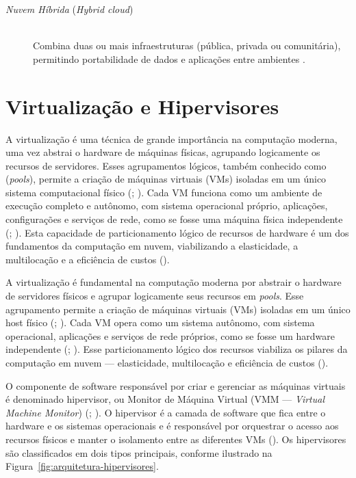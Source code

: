 \begin{itemize}
\begin{description}
  \item[\emph{Nuvem Híbrida} (\textit{Hybrid cloud})] \hfill \\ Combina duas ou mais infraestruturas (pública, privada ou comunitária), permitindo portabilidade de dados e aplicações entre ambientes \cite{mell2011}.
\end{description}
 

\section{Virtualização e Hipervisores}
A virtualização é uma técnica de grande importância na computação moderna, uma vez  abstrai o hardware de máquinas físicas, agrupando logicamente os recursos de servidores. Esses agrupamentos lógicos, também conhecido como (\textit{pools}), permite a criação de máquinas virtuais (VMs) isoladas em um único sistema computacional físico (\cite{carissimi2008}; \cite{kominos2017}). Cada VM funciona como um ambiente de execução completo e autônomo, com sistema operacional próprio, aplicações, configurações e  serviços de rede, como se fosse uma máquina física independente (\cite{carissimi2008}; \cite{smith2005}). Esta capacidade de particionamento lógico de recursos de hardware é um dos fundamentos da computação em nuvem, viabilizando a elasticidade, a multilocação e a eficiência de custos (\cite{chawla2025}).

A virtualização é fundamental na computação moderna por abstrair o hardware de servidores físicos e agrupar logicamente seus recursos em \textit{pools}. Esse agrupamento permite a criação de máquinas virtuais (VMs) isoladas em um único host físico (\cite{carissimi2008}; \cite{kominos2017}). Cada VM opera como um sistema autônomo, com sistema operacional, aplicações e serviços de rede próprios, como se fosse um hardware independente (\cite{carissimi2008}; \cite{smith2005}). Esse particionamento lógico dos recursos viabiliza os pilares da computação em nuvem — elasticidade, multilocação e eficiência de custos (\cite{chawla2025}).

O componente de software responsável por criar e gerenciar as máquinas virtuais é denominado hipervisor, ou Monitor de Máquina Virtual (VMM — \textit{Virtual Machine Monitor}) (\cite{chawla2025}; \cite{carissimi2008}). O hipervisor é a camada de software que fica entre o hardware e os sistemas operacionais e é responsável por orquestrar o acesso aos recursos físicos e manter o isolamento entre as diferentes VMs (\cite{chawla2025}). Os hipervisores são classificados em dois tipos principais, conforme ilustrado na Figura~\ref{fig:arquitetura-hipervisores}.


\end{itemize}
